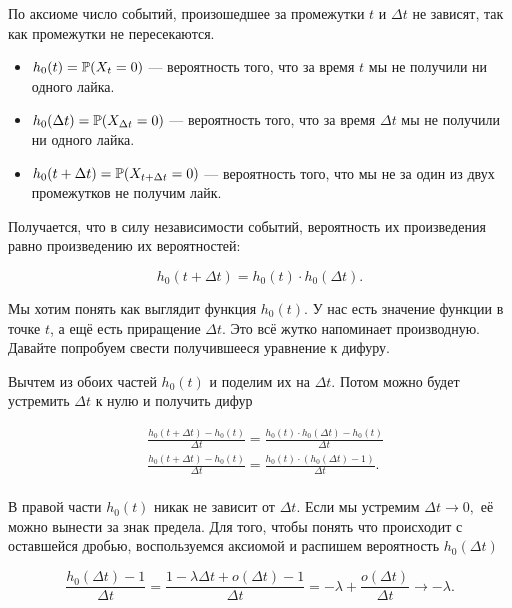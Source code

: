 \documentclass[12pt, a4paper, oneside]{article}
\begin{document}
По аксиоме  число событий, произошедшее за промежутки $t$ и $\Delta t$ не зависят, так как промежутки не пересекаются.

\begin{itemize} 
\item  $h_0(t) = \mathbb{P}(X_t = 0)$ --- вероятность того, что за время $t$ мы не получили ни одного лайка. 

\item $h_0(\Delta t) = \mathbb{P}(X_{\Delta t} = 0)$ --- вероятность того, что за время $\Delta t$ мы не получили ни одного лайка. 

\item $h_0(t + \Delta t) = \mathbb{P}(X_{t + \Delta t} = 0)$ --- вероятность того, что мы не за один из двух промежутков не получим лайк. 
\end{itemize} 

Получается, что в силу независимости событий, вероятность их произведения равно произведению их вероятностей: 

\[
h_0(t + \Delta t) = h_0(t) \cdot h_0(\Delta t).
\]

Мы хотим понять как выглядит функция $h_0(t).$ У нас есть значение функции в точке $t$, а ещё есть приращение $\Delta t$. Это всё жутко напоминает производную. Давайте попробуем свести получившееся уравнение к дифуру. 

Вычтем из обоих частей $h_0(t)$ и поделим их на $\Delta t$. Потом можно будет устремить $\Delta t$ к нулю и получить дифур

\begin{equation*}
\begin{aligned} 
    & \frac{ h_0(t + \Delta t) - h_0(t)}{\Delta t} = \frac{h_0(t) \cdot h_0(\Delta t) - h_0(t)}{\Delta t} \\
    & \frac{ h_0(t + \Delta t) - h_0(t)}{\Delta t} = \frac{h_0(t) \cdot( h_0(\Delta t) - 1)}{\Delta t}. \\
\end{aligned}
\end{equation*}

В правой части $h_0(t)$ никак не зависит от $\Delta t$. Если мы устремим $\Delta t \to 0,$ её можно вынести за знак предела. Для того, чтобы понять что происходит с оставшейся дробью, воспользуемся аксиомой   и распишем вероятность $h_0(\Delta t)$

\[
\frac{ h_0(\Delta t) - 1}{\Delta t} = \frac{ 1 - \lambda \Delta t + o(\Delta t) - 1}{\Delta t} = - \lambda  + \frac{o(\Delta t)}{\Delta t} \to -\lambda.
\]
\end{document}
